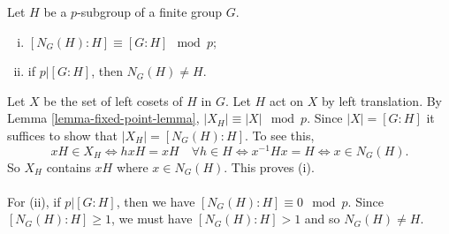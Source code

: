 \begin{proposition} \label{prop-p-subgroup-and-normalizer}
	Let $H$ be a $p$-subgroup of a finite group $G$.
	\begin{enumerate}[(i)]
		\item $[N_G(H):H] \equiv [G:H] \mod p$;
		\item if $p|[G:H]$, then $N_G(H) \neq H$.
	\end{enumerate}
\end{proposition}
\begin{sketch}
	Let $X$ be the set of left cosets of $H$ in $G$. Let $H$ act on $X$ by left translation. By Lemma \ref{lemma-fixed-point-lemma}, $|X_H|\equiv |X|\mod p$. Since $|X| = [G:H]$ it suffices to show that $|X_H| = [N_G(H):H]$. To see this, 
	$$xH\in X_H\iff hxH = xH \quad \forall h\in H\iff x^{-1}Hx = H\iff x\in N_G(H).$$ 
	So $X_H$ contains $xH$ where $x\in N_G(H)$. This proves (i). 
	\\ \\
	For (ii), if $p|[G:H]$, then we have $[N_G(H):H]\equiv 0 \mod p$. Since $[N_G(H):H]\geq 1$, we must have $[N_G(H):H]>1$ and so $N_G(H)\neq H$.
\end{sketch}

